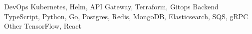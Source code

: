 
\begin{cvskills}
  \cvskill
    {DevOps}
    {Kubernetes, Helm, API Gateway, Terraform, Gitops }
  \cvskill
    {Backend}
    {TypeScript, Python, Go, Postgres, Redis, MongoDB, Elasticsearch, SQS, gRPC}
  \cvskill
    {Other}
    {TensorFlow, React}
\end{cvskills}
